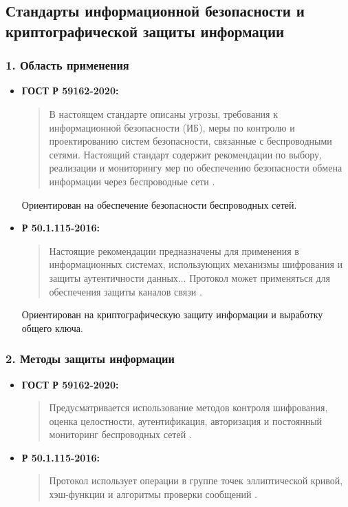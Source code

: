 \subsection{Стандарты информационной безопасности и криптографической защиты информации}

\subsubsection*{1. Область применения}

\begin{itemize}
    \item \textbf{ГОСТ Р 59162-2020:}
    \begin{quote}
        В настоящем стандарте описаны угрозы, требования к информационной безопасности (ИБ), меры по контролю и проектированию систем безопасности, связанные с беспроводными сетями. Настоящий стандарт содержит рекомендации по выбору, реализации и мониторингу мер по обеспечению безопасности обмена информации через беспроводные сети \cite[стр.~1]{gost_r_59162}.
    \end{quote}
    Ориентирован на обеспечение безопасности беспроводных сетей.

    \item \textbf{Р 50.1.115-2016:}
    \begin{quote}
        Настоящие рекомендации предназначены для применения в информационных системах, использующих механизмы шифрования и защиты аутентичности данных... Протокол может применяться для обеспечения защиты каналов связи \cite[стр.~1]{r_50_1_115}.
    \end{quote}
    Ориентирован на криптографическую защиту информации и выработку общего ключа.
\end{itemize}

\subsubsection*{2. Методы защиты информации}

\begin{itemize}
    \item \textbf{ГОСТ Р 59162-2020:}
    \begin{quote}
        Предусматривается использование методов контроля шифрования, оценка целостности, аутентификация, авторизация и постоянный мониторинг беспроводных сетей \cite[стр.~12]{gost_r_59162}.
    \end{quote}

    \item \textbf{Р 50.1.115-2016:}
    \begin{quote}
        Протокол использует операции в группе точек эллиптической кривой, хэш-функции и алгоритмы проверки сообщений \cite[стр.~3]{r_50_1_115}.
    \end{quote}
\end{itemize}

